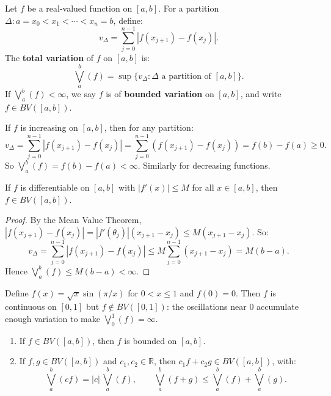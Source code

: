 \documentclass[11pt]{report}
\begin{document}
\begin{defbox}
Let $f$ be a real-valued function on $[a, b]$. For a partition $\Delta: a = x_0 < x_1 < \cdots < x_n = b$, define:
\[
v_\Delta = \sum_{j=0}^{n-1} |f(x_{j+1}) - f(x_j)|.
\]
The \textbf{total variation} of $f$ on $[a, b]$ is:
\[
\bigvee_a^b(f) = \sup\{v_\Delta : \Delta \text{ a partition of } [a, b]\}.
\]
If $\bigvee_a^b(f) < \infty$, we say $f$ is of \textbf{bounded variation} on $[a, b]$, and write $f \in BV([a, b])$.
\end{defbox}

\begin{exbox}
If $f$ is increasing on $[a, b]$, then for any partition:
\[
v_\Delta = \sum_{j=0}^{n-1} |f(x_{j+1}) - f(x_j)| = \sum_{j=0}^{n-1} (f(x_{j+1}) - f(x_j)) = f(b) - f(a) \geq 0.
\]
So $\bigvee_a^b(f) = f(b) - f(a) < \infty$. Similarly for decreasing functions.
\end{exbox}

\begin{propbox}
If $f$ is differentiable on $[a, b]$ with $|f'(x)| \leq M$ for all $x \in [a, b]$, then $f \in BV([a, b])$.
\end{propbox}

\begin{proof}
By the Mean Value Theorem, $|f(x_{j+1}) - f(x_j)| = |f'(\theta_j)|(x_{j+1} - x_j) \leq M(x_{j+1} - x_j)$. So:
\[
v_\Delta = \sum_{j=0}^{n-1} |f(x_{j+1}) - f(x_j)| \leq M \sum_{j=0}^{n-1} (x_{j+1} - x_j) = M(b - a).
\]
Hence $\bigvee_a^b(f) \leq M(b - a) < \infty$.
\end{proof}

\begin{exbox}
Define $f(x) = \sqrt{x}\sin(\pi/x)$ for $0 < x \leq 1$ and $f(0) = 0$. Then $f$ is continuous on $[0, 1]$ but $f \notin BV([0, 1])$: the oscillations near $0$ accumulate enough variation to make $\bigvee_0^1(f) = \infty$.
\end{exbox}

\begin{propbox}
\begin{enumerate}[label=(\roman*)]
\item If $f \in BV([a, b])$, then $f$ is bounded on $[a, b]$.
\item If $f, g \in BV([a, b])$ and $c_1, c_2 \in \mathbb{R}$, then $c_1 f + c_2 g \in BV([a, b])$, with:
\[
\bigvee_a^b(cf) = |c|\,\bigvee_a^b(f), \qquad \bigvee_a^b(f + g) \leq \bigvee_a^b(f) + \bigvee_a^b(g).
\]
\end{enumerate}
\end{propbox}
\end{document}
